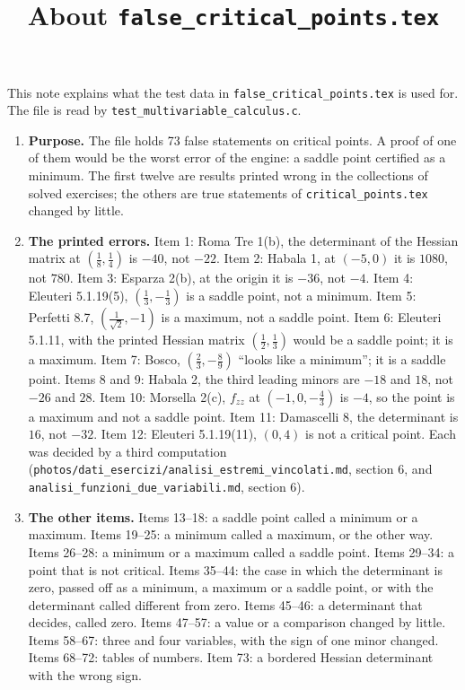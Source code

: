 \documentclass[11pt,a4paper]{article}
\title{About \texttt{false\_critical\_points.tex}}
\author{}
\date{}
\begin{document}
\maketitle
This note explains what the test data in \texttt{false\_critical\_points.tex} is used for. The file is read by \texttt{test\_multivariable\_calculus.c}.

\begin{enumerate}
\item \textbf{Purpose.} The file holds 73 false statements on critical points. A proof of one of them would be the worst error of the engine: a saddle point certified as a minimum. The first twelve are results printed wrong in the collections of solved exercises; the others are true statements of \texttt{critical\_points.tex} changed by little.

\item \textbf{The printed errors.} Item 1: Roma Tre 1(b), the determinant of the Hessian matrix at $(\frac{1}{8}, \frac{1}{4})$ is $-40$, not $-22$. Item 2: Habala 1, at $(-5, 0)$ it is $1080$, not $780$. Item 3: Esparza 2(b), at the origin it is $-36$, not $-4$. Item 4: Eleuteri 5.1.19(5), $(\frac{1}{3}, -\frac{1}{3})$ is a saddle point, not a minimum. Item 5: Perfetti 8.7, $(\frac{1}{\sqrt{2}}, -1)$ is a maximum, not a saddle point. Item 6: Eleuteri 5.1.11, with the printed Hessian matrix $(\frac{1}{2}, \frac{1}{3})$ would be a saddle point; it is a maximum. Item 7: Bosco, $(\frac{2}{3}, -\frac{8}{9})$ ``looks like a minimum''; it is a saddle point. Items 8 and 9: Habala 2, the third leading minors are $-18$ and $18$, not $-26$ and $28$. Item 10: Morsella 2(c), $f_{zz}$ at $(-1, 0, -\frac{4}{3})$ is $-4$, so the point is a maximum and not a saddle point. Item 11: Damascelli 8, the determinant is $16$, not $-32$. Item 12: Eleuteri 5.1.19(11), $(0, 4)$ is not a critical point. Each was decided by a third computation (\texttt{photos/dati\_esercizi/analisi\_estremi\_vincolati.md}, section 6, and \texttt{analisi\_funzioni\_due\_variabili.md}, section 6).

\item \textbf{The other items.} Items 13--18: a saddle point called a minimum or a maximum. Items 19--25: a minimum called a maximum, or the other way. Items 26--28: a minimum or a maximum called a saddle point. Items 29--34: a point that is not critical. Items 35--44: the case in which the determinant is zero, passed off as a minimum, a maximum or a saddle point, or with the determinant called different from zero. Items 45--46: a determinant that decides, called zero. Items 47--57: a value or a comparison changed by little. Items 58--67: three and four variables, with the sign of one minor changed. Items 68--72: tables of numbers. Item 73: a bordered Hessian determinant with the wrong sign.


\end{enumerate}
\end{document}
